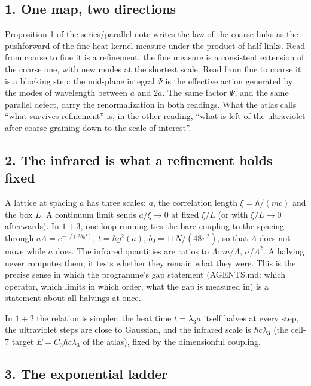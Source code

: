 \documentclass[11pt,a4paper]{article}
\begin{document}
\hypertarget{one-map-two-directions}{%
\subsection{1. One map, two directions}\label{one-map-two-directions}}

Proposition 1 of the series/parallel note writes the law of the coarse
links as the pushforward of the fine heat-kernel measure under the
product of half-links. Read from coarse to fine it is a refinement: the
fine measure is a consistent extension of the coarse one, with new modes
at the shortest scale. Read from fine to coarse it is a blocking step:
the mid-plane integral \(\Psi\) is the effective action generated by the
modes of wavelength between \(a\) and \(2a\). The same factor \(\Psi\),
and the same parallel defect, carry the renormalization in both
readings. What the atlas calls ``what survives refinement'' is, in the
other reading, ``what is left of the ultraviolet after coarse-graining
down to the scale of interest''.

\hypertarget{the-infrared-is-what-a-refinement-holds-fixed}{%
\subsection{2. The infrared is what a refinement holds
fixed}\label{the-infrared-is-what-a-refinement-holds-fixed}}

A lattice at spacing \(a\) has three scales: \(a\), the correlation
length \(\xi=\hbar/(mc)\) and the box \(L\). A continuum limit sends
\(a/\xi\to0\) at fixed \(\xi/L\) (or with \(\xi/L\to0\) afterwards). In
\(1+3\), one-loop running ties the bare coupling to the spacing through
\(a\Lambda=e^{-1/(2b_0t)}\), \(t=\hbar g^2(a)\), \(b_0=11N/(48\pi^2)\),
so that \(\Lambda\) does not move while \(a\) does. The infrared
quantities are ratios to \(\Lambda\): \(m/\Lambda\),
\(\sigma/\Lambda^2\). A halving never computes them; it tests whether
they remain what they were. This is the precise sense in which the
programme's gap statement (AGENTS.md: which operator, which limits in
which order, what the gap is measured in) is a statement about all
halvings at once.

In \(1+2\) the relation is simpler: the heat time \(t=\lambda_3a\)
itself halves at every step, the ultraviolet steps are close to
Gaussian, and the infrared scale is \(\hbar c\lambda_3\) (the cell-7
target \(E=C_3\hbar c\lambda_3\) of the atlas), fixed by the
dimensionful coupling.

\hypertarget{the-exponential-ladder}{%
\subsection{3. The exponential ladder}\label{the-exponential-ladder}}
\end{document}
